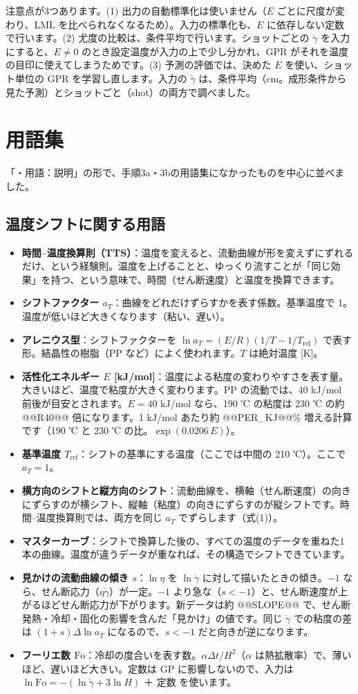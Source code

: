 \documentclass[paper=a4paper,fontsize=10.5pt,line_length=44zw,number_of_lines=38]{jlreq}
\newcommand{\gd}{\dot{\gamma}}
\newenvironment{termlist}{\begin{itemize}[label=・,leftmargin=1\zw,labelwidth=1\zw,labelsep=0pt,itemsep=0.4ex,topsep=0.6ex,parsep=0pt]}{\end{itemize}}
\newcommand{\term}[1]{\item \textbf{#1}：}
\begin{document}
注意点が3つあります。(1) 出力の自動標準化は使いません（$E$ ごとに尺度が変わり、LML を比べられなくなるため）。入力の標準化も、$E$ に依存しない定数で行います。(2) 尤度の比較は、条件平均で行います。ショットごとの $\gd$ を入力にすると、$E\ne 0$ のとき設定温度が入力の上で少し分かれ、GPR がそれを温度の目印に使えてしまうためです。(3) 予測の評価では、決めた $E$ を使い、ショット単位の GPR を学習し直します。入力の $\gd$ は、条件平均（cm。成形条件から見た予測）とショットごと（shot）の両方で調べました。

\section{用語集}

「・用語：説明」の形で、手順3a・3bの用語集になかったものを中心に並べました。

\subsection{温度シフトに関する用語}
\begin{termlist}
\term{時間–温度換算則（TTS）}温度を変えると、流動曲線が形を変えずにずれるだけ、という経験則。温度を上げることと、ゆっくり流すことが「同じ効果」を持つ、という意味で、時間（せん断速度）と温度を換算できます。
\term{シフトファクター $a_T$}曲線をどれだけずらすかを表す係数。基準温度で 1。温度が低いほど大きくなります（粘い、遅い）。
\term{アレニウス型}シフトファクターを $\ln a_T = (E/R)(1/T - 1/T_{\mathrm{ref}})$ で表す形。結晶性の樹脂（PP など）によく使われます。$T$ は絶対温度 [K]。
\term{活性化エネルギー $E$ [kJ/mol]}温度による粘度の変わりやすさを表す量。大きいほど、温度で粘度が大きく変わります。PP の流動では、40 kJ/mol 前後が目安とされます。$E = 40$ kJ/mol なら、190 ℃ の粘度は 230 ℃ の約 @@R40@@ 倍になります。1 kJ/mol あたり約 @@PER_KJ@@\% 増える計算です（190 ℃ と 230 ℃ の比。$\exp(0.0206\,E)$）。
\term{基準温度 $T_{\mathrm{ref}}$}シフトの基準にする温度（ここでは中間の 210 ℃）。ここで $a_T = 1$。
\term{横方向のシフトと縦方向のシフト}流動曲線を、横軸（せん断速度）の向きにずらすのが横シフト、縦軸（粘度）の向きにずらすのが縦シフトです。時間–温度換算則では、両方を同じ $a_T$ でずらします（式(1)）。
\term{マスターカーブ}シフトで換算した後の、すべての温度のデータを重ねた1本の曲線。温度が違うデータが重なれば、その構造でシフトできています。
\term{見かけの流動曲線の傾き $s$}$\ln\eta$ を $\ln\gd$ に対して描いたときの傾き。$-1$ なら、せん断応力（$\eta\gd$）が一定。$-1$ より急な（$s<-1$）と、せん断速度が上がるほどせん断応力が下がります。新データは約 @@SLOPE@@ で、せん断発熱・冷却・固化の影響を含んだ「見かけ」の値です。同じ $\gd$ での粘度の差は $(1+s)\Delta\ln a_T$ になるので、$s<-1$ だと向きが逆になります。
\term{フーリエ数 $\mathrm{Fo}$}冷却の度合いを表す数。$\alpha\Delta t/H^2$（$\alpha$ は熱拡散率）で、薄いほど、遅いほど大きい。定数は GP に影響しないので、入力は $\ln\mathrm{Fo} = -(\ln\gd + 3\ln H)$ ＋ 定数 を使います。
\end{termlist}
\end{document}
